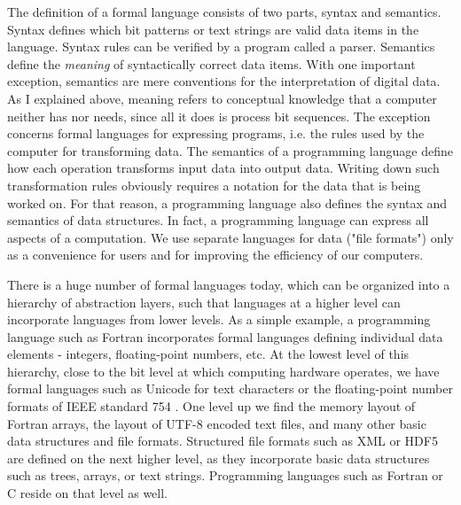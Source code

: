 The definition of a formal language consists of two parts, syntax and semantics. Syntax defines which bit patterns or text strings are valid data items in the language. Syntax rules can be verified by a program called a parser. Semantics define the \textit{meaning} of syntactically correct data items. With one important exception, semantics are mere conventions for the interpretation of digital data. As I explained above, meaning refers to conceptual knowledge that a computer neither has nor needs, since all it does is process bit sequences. The exception concerns formal languages for expressing programs, i.e. the rules used by the computer for transforming data. The semantics of a programming language define how each operation transforms input data into output data. Writing down such transformation rules obviously requires a notation for the data that is being worked on. For that reason, a programming language also defines the syntax and semantics of data structures. In fact, a programming language can express all aspects of a computation. We use separate languages for data ("file formats") only as a convenience for users and for improving the efficiency of our computers.

There is a huge number of formal languages today, which can be organized into a hierarchy of abstraction layers, such that languages at a higher level can incorporate languages from lower levels. As a simple example, a programming language such as Fortran incorporates formal languages defining individual data elements - integers, floating-point numbers, etc. At the lowest level of this hierarchy, close to the bit level at which computing hardware operates, we have formal languages such as Unicode \cite{_unicode_2015} for text characters or the floating-point number formats of IEEE standard 754 \cite{_ieee_2008}. One level up we find the memory layout of Fortran arrays, the layout of UTF-8 encoded text files, and many other basic data structures and file formats. Structured file formats such as XML \cite{_extensible_1998} or HDF5 \cite{hdf5} are defined on the next higher level, as they incorporate basic data structures such as trees, arrays, or text strings. Programming languages such as Fortran or C reside on that level as well.

